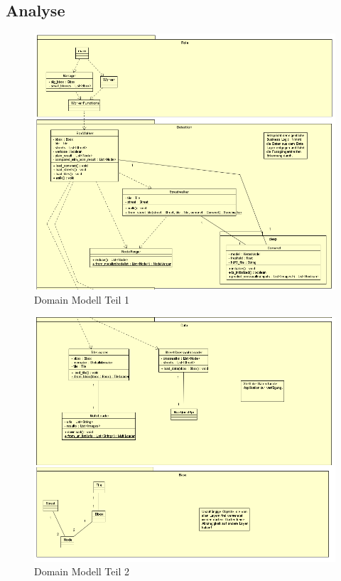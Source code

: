 \subsection{Analyse}
\begin{figure}[H]
	\includegraphics[width=\textwidth]{images/domain_model_komplett1.png}
	\caption{Domain Modell Teil 1}
\end{figure}
\begin{figure}[H]
	\includegraphics[width=\textwidth]{images/domain_model_komplett2.png}
	\caption{Domain Modell Teil 2}
\end{figure}

